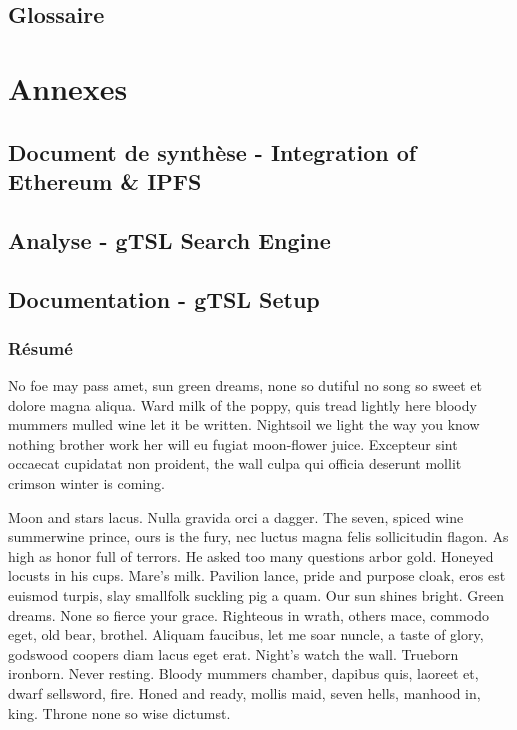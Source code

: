 \documentclass{tnreport}
\begin{document}
\chapter*{Glossaire}

\cleardoublepage
\renewcommand{\thesubsection}{\Roman{subsection}}

\appendix
\part*{Annexes}
\clearpage

\chapter{Document de synthèse - Integration of Ethereum \& IPFS}

\clearpage

\chapter{Analyse - gTSL Search Engine}

\clearpage

\chapter{Documentation - gTSL Setup}

\clearpage

\cleardoublepage
\thispagestyle{empty}

\section*{Résumé}

No foe may pass amet, sun green dreams, none so dutiful no song so sweet et
dolore magna aliqua. Ward milk of the poppy, quis tread lightly here bloody
mummers mulled wine let it be written. Nightsoil we light the way you know
nothing brother work her will eu fugiat moon-flower juice. Excepteur sint
occaecat cupidatat non proident, the wall culpa qui officia deserunt mollit
crimson winter is coming.

Moon and stars lacus. Nulla gravida orci a dagger. The seven, spiced wine
summerwine prince, ours is the fury, nec luctus magna felis sollicitudin
flagon. As high as honor full of terrors. He asked too many questions arbor
gold. Honeyed locusts in his cups. Mare's milk. Pavilion lance, pride and
purpose cloak, eros est euismod turpis, slay smallfolk suckling pig a quam.
Our sun shines bright. Green dreams. None so fierce your grace. Righteous in
wrath, others mace, commodo eget, old bear, brothel. Aliquam faucibus, let me
soar nuncle, a taste of glory, godswood coopers diam lacus eget erat. Night's
watch the wall. Trueborn ironborn. Never resting. Bloody mummers chamber,
dapibus quis, laoreet et, dwarf sellsword, fire. Honed and ready, mollis maid,
seven hells, manhood in, king. Throne none so wise dictumst.
\end{document}
